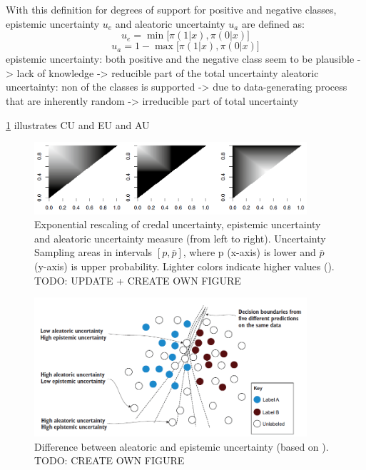 With this definition for degrees of support for positive and negative classes, epistemic uncertainty $u_e$ and aleatoric uncertainty $u_a$ are defined as:
\begin{equation}
u_e = \min \bigg[ \pi(1 | x), \pi(0 | x) \bigg]
\end{equation}
\begin{equation}
u_a = 1 - \max \bigg[ \pi(1 | x), \pi(0 | x) \bigg]
\end{equation}
epistemic uncertainty: both positive and the negative class seem to be plausible -> lack of knowledge -> reducible part of the total uncertainty
aleatoric uncertainty: non of the classes is supported -> due to data-generating process that are inherently random -> irreducible part of total uncertainty


\ref{fig:uncertainty_measures} illustrates \ac{CU} and \ac{EU} and \ac{AU}

\begin{figure}[t]
  \centering
    \includegraphics[width=0.90\textwidth]{figures/uncertainty_measures.PNG}
  \caption{Exponential rescaling of credal uncertainty, epistemic uncertainty and aleatoric uncertainty measure (from left to right). 
  Uncertainty Sampling areas in intervals $[p, \bar{p}]$, where p (x-axis) is lower and $\bar{p}$ (y-axis) is upper probability. Lighter colors indicate higher values (\cite{nguyen2021howtomeasure}).
  TODO: UPDATE + CREATE OWN FIGURE}
  \label{fig:uncertainty_measures}
\end{figure}



\begin{figure}[t]
  \centering
    \includegraphics[width=0.90\textwidth]{figures/uncertainty_differences.PNG}
  \caption{Difference between aleatoric and epistemic uncertainty (based on \cite{human-in-the-loop}).
  TODO: CREATE OWN FIGURE}
  \label{fig:uncertainty_differences}
\end{figure}




